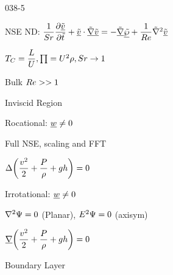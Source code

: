 \begin{mitframe}{038-5}

        
\begin{listone}

\item NSE ND: $\dfrac{1}{\strouhal}\dfrac{\partial\uline{\tilde{\vvel}}}{\partial\tilde{t}}+\uline{\tilde{\vvel}}\cdot\tilde{\gradop}\uline{\tilde{\vvel}}=-\tilde{\gradop}\uline{\tilde{\dynpress}}+\dfrac{1}{\reynolds}\tilde{\nabla}^2\uline{\tilde{\vvel}}$

  \item $\Temp_{\conc}=\dfrac{\length}{\uvel}, \prod=\uvel^2\dens,\strouhal\rightarrow{1}$

			\begin{listtwo}
           \item Bulk $\reynolds >> 1$
            \end{listtwo}
      
\item Inviscid Region

			\begin{listtwo}
            \item Rocational: $\vort\neq{0}$

\end{listtwo}
            		\begin{listthree}
                    
                    \item Full NSE, scaling and FFT
                    
                    \item $\iipf\bigg(\dfrac{\vvel^2}{2}+\dfrac{\p}{\dens}+\grav\planck\bigg)=0$

					\end{listthree}
              \begin{listtwo}

               \item Irrotational: $\vort\neq{0}$
               		\begin{listthree}
                    \item $\nabla^2\streamfunc=0$ (Planar), $\energy^2\streamfunc=0$ (axisym)
					\item $\gradop\bigg(\dfrac{\vvel^2}{2}+\dfrac{\p}{\dens}+\grav\planck\bigg)=0$
					\end{listthree}
				\end{listtwo}
\item Boundary Layer
				

\end{listone}
\end{mitframe}
